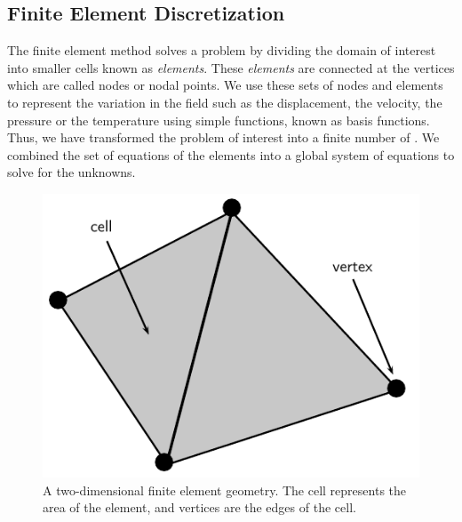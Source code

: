 
\subsection{Finite Element Discretization}

The finite element method solves a problem by dividing the domain of interest into smaller cells known as \textit{elements}. These \textit{elements} are connected at the vertices which are called nodes or nodal points. We use these sets of nodes and elements to represent the variation in the field such as the displacement, the velocity, the pressure or the temperature using simple functions, known as basis functions. Thus, we have transformed the problem of interest into a finite number of . We combined the set of equations of the elements into a global system of equations to solve for the unknowns.

	\begin{figure}[!h]
	\centering
	\includegraphics[width=0.4\linewidth]{./figures/eulerian/finiteElementDefinitions.pdf}
	\caption{A two-dimensional finite element geometry. The cell represents the area of the element, and vertices are the edges of the cell.}
	\label{fig:finiteElementDefinitions}
	\end{figure}

